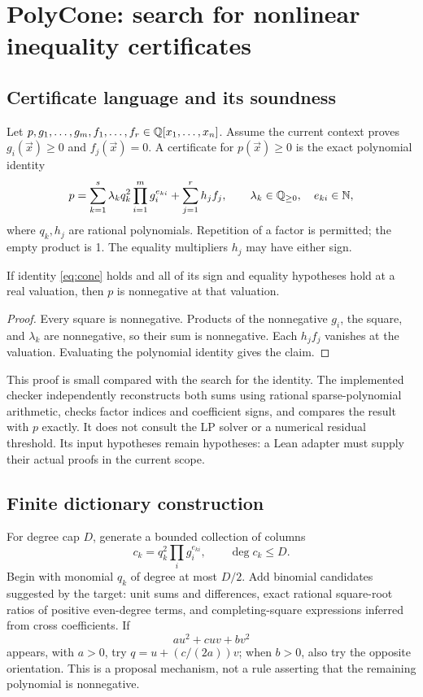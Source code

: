 \section{PolyCone: search for nonlinear inequality certificates}

\subsection{Certificate language and its soundness}

Let $p,g_1,\ldots,g_m,f_1,\ldots,f_r\in\mathbb{Q}[x_1,\ldots,x_n]$.
Assume the current context proves $g_i(\vec x)\geq0$ and
$f_j(\vec x)=0$. A certificate for $p(\vec x)\geq0$ is the exact polynomial
identity
\begin{equation}\label{eq:cone}
 p=\sum_{k=1}^{s}\lambda_k q_k^2\prod_{i=1}^{m}g_i^{e_{ki}}
   +\sum_{j=1}^{r}h_j f_j,
 \qquad \lambda_k\in\mathbb{Q}_{\geq0},\quad e_{ki}\in\mathbb{N},
\end{equation}
where $q_k,h_j$ are rational polynomials. Repetition of a factor is permitted;
the empty product is 1. The equality multipliers $h_j$ may have either sign.

\begin{proposition}\label{prop:cone}
If identity \eqref{eq:cone} holds and all of its sign and equality hypotheses
hold at a real valuation, then $p$ is nonnegative at that valuation.
\end{proposition}
\begin{proof}
Every square is nonnegative. Products of the nonnegative $g_i$, the square,
and $\lambda_k$ are nonnegative, so their sum is nonnegative. Each $h_jf_j$
vanishes at the valuation. Evaluating the polynomial identity gives the claim.
\end{proof}

This proof is small compared with the search for the identity. The implemented
checker independently reconstructs both sums using rational sparse-polynomial
arithmetic, checks factor indices and coefficient signs, and compares the
result with $p$ exactly. It does not consult the LP solver or a numerical
residual threshold. Its input hypotheses remain hypotheses: a Lean adapter
must supply their actual proofs in the current scope.

\subsection{Finite dictionary construction}

For degree cap $D$, generate a bounded collection of columns
\[
 c_k=q_k^2\prod_i g_i^{e_{ki}},\qquad \deg c_k\leq D.
\]
Begin with monomial $q_k$ of degree at most $D/2$. Add binomial candidates
suggested by the target: unit sums and differences, exact rational square-root
ratios of positive even-degree terms, and completing-square expressions
inferred from cross coefficients. If
\[
 a u^2+cuv+bv^2
\]
appears, with $a>0$, try $q=u+(c/(2a))v$; when $b>0$, also try the opposite
orientation. This is a proposal mechanism, not a rule asserting that the
remaining polynomial is nonnegative.

